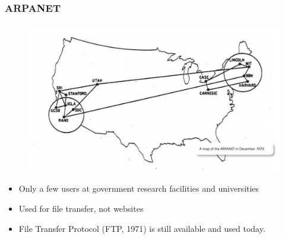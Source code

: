 \documentclass{beamer}
\begin{document}
%
%
\begin{frame}[fragile]
    \frametitle{ARPANET}
    \begin{minipage}{0.48\textwidth}
        \begin{figure}
            \includegraphics[width=\textwidth]{./imgs/arpanet.png}
        \end{figure}
    \end{minipage}
    \begin{minipage}{0.48\textwidth}
        \begin{itemize}
            \item Only a few users at government research facilities and universities
            \item Used for file transfer, not websites
            \item File Transfer Protocol (FTP, 1971) is still available and used today.
        \end{itemize}
    \end{minipage}
\end{frame}
\end{document}
